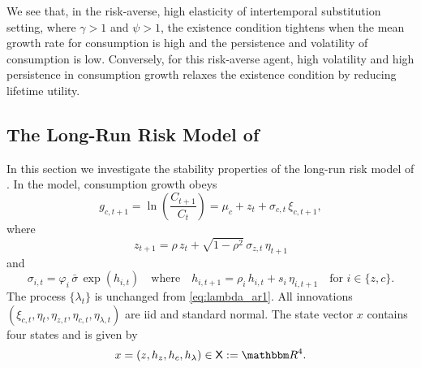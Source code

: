 \documentclass[12pt, reqno]{amsart}
\newcommand{\1}{\mathbbm 1}
\newcommand{\RR}{\mathbbm R}
\renewcommand{\phi}{\varphi}
\newcommand{\XX}{\mathsf X}
\theoremstyle{plain}
\theoremstyle{definition}
\begin{document}
We see that, in the risk-averse, high elasticity of intertemporal substitution
setting, where $\gamma > 1$ and $\psi > 1$, the existence condition tightens
when the mean growth rate for consumption is high and the persistence and volatility of
consumption is low.  Conversely, for this risk-averse agent, high volatility and high persistence in
consumption growth relaxes the existence condition by reducing lifetime
utility.



\subsection{The Long-Run Risk Model of \cite{schorfheide2018identifying}}

In this section we investigate the stability properties of the long-run risk
model of \cite{schorfheide2018identifying}. In the model, consumption growth obeys
%
\begin{equation}\label{eq:ssycg}
    g_{c, t+1} 
    = \ln \left( \frac{C_{t+1}}{C_t} \right)    
       = \mu_c + z_t + \sigma_{c, t} \, \xi_{c, t+1},
\end{equation}
%
where
%
\begin{equation*}
    z_{t+1} 
        = \rho \, z_t + \sqrt{1 - \rho^2} \, 
                \sigma_{z, t} \, \eta_{t+1}
\end{equation*}
%
and
%
\begin{equation*}
    \sigma_{i,t} 
        = \phi_i \, \bar{\sigma} \, \exp(h_{i, t})
        \quad \text{where} \quad
    h_{i, t+1}
        = \rho_i \, h_{i,t} + s_i \, \eta_{i, t+1}
        \quad \text{for } i \in \{z, c\}.
\end{equation*}
%
The process $\{\lambda_t\}$ is unchanged from \eqref{eq:lambda_ar1}. All
innovations $(\xi_{c, t}, \eta_t,  \eta_{z, t}, \eta_{c, t}, \eta_{\lambda,
t})$ are {\sc iid} and standard normal.  The state vector $x$ contains four
states and is given by
%
\begin{equation}\label{eq:state}
    x = (z, h_z, h_c, h_\lambda) \in \XX := \RR^4.
\end{equation}
\end{document}
